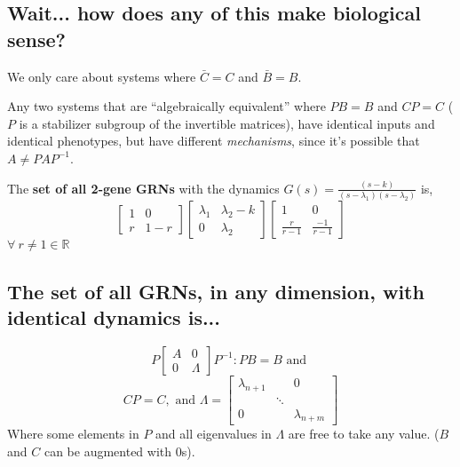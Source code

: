 \documentclass{seminar}
\begin{document}
  \begin{slide}
    \section*{Wait... how does any of this make biological sense?}
    We only care about systems where $\bar{C} = C$ and $\bar{B} = B$.

    Any two systems that are ``algebraically equivalent'' where $PB = B$ and $CP = C$ ($P$ is a stabilizer subgroup of the invertible matrices), have identical inputs and identical phenotypes, but have different \textit{mechanisms}, since it's possible that $A \neq PAP^{-1}$.

    The \textbf{set of all 2-gene GRNs} with the dynamics $G(s) = \frac{(s-k)}{(s-\lambda_{1})(s-\lambda_{2})}$ is, 
      \begin{equation*}
        \begin{bmatrix} 1 & 0 \\ r & 1-r \end{bmatrix} \begin{bmatrix} \lambda_{1} & \lambda_{2} - k \\ 0 & \lambda_{2} \end{bmatrix} \begin{bmatrix} 1 & 0 \\ \frac{r}{r-1} & \frac{-1}{r-1} \end{bmatrix}
      \end{equation*}
      $\forall \ r \neq 1 \in \mathbb{R}$
  \end{slide}


  \begin{slide}
    \section*{The set of all GRNs, in any dimension, with identical dynamics is...}
    \begin{equation*}
    P \left[
      \begin{array}{cc}
        A &  0  \\
        0 & \Lambda 
      \end{array}\right] P^{-1} : PB = B \text{ and } 
    \end{equation*}
    \begin{equation*}
      CP = C,  \text{ and } \Lambda = \begin{bmatrix} 
      \lambda_{n+1} &  & 0 \\
      & \ddots & \\
      0 &        & \lambda_{n+m} 
    \end{bmatrix}
    \end{equation*}
    Where some elements in $P$ and all eigenvalues in $\Lambda$ are free to take any value.
    ($B$ and $C$ can be augmented with $0$s).
  \end{slide}
\end{document}
